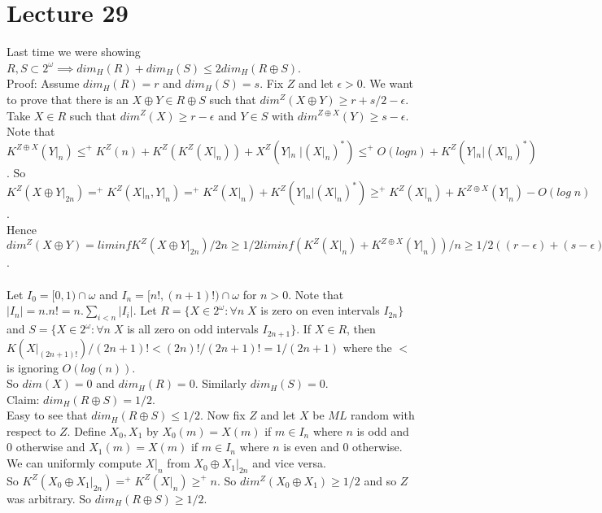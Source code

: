 \documentclass{article}
\begin{document}
  \section{Lecture 29}
  Last time we were showing $R, S \subset 2^\omega \implies dim_H(R) + dim_H(S) \leq 2 dim_H(R\oplus S)$.\\
  Proof: Assume $dim_H(R) = r$ and $dim_H(S) = s$. Fix $Z$ and let $\epsilon > 0$. We want to prove that there is an $X \oplus Y \in R\oplus S$ such that $dim^Z(X \oplus Y) \geq r+s/2 - \epsilon$.\\
  Take $X \in R$ such that $dim^Z(X) \geq r- \epsilon$ and $Y \in S$ with $dim^{Z \oplus X}(Y) \geq s-\epsilon.$\\
  Note that $K^{Z \oplus X}(Y|_n) \leq^+ K^Z(n) + K^Z(K^Z(X|_n)) + X^Z(Y|_n \; | (X|_n)^*) \leq^+ O(log n) + K^Z(Y|_n | (X|_n)^*)$. So $K^Z(X \oplus Y |_{2n}) =^+ K^Z(X|_n,Y|_n) =^+ K^Z(X|_n) + K^Z(Y|_n| (X|_n)^*) \geq^+ K^Z(X|_n) + K^{Z \oplus X} (Y|_n) - O(log\; n)$.
  \\ Hence $dim^Z(X \oplus Y) = lim inf K^Z( X \oplus Y |_{2n})/2n \geq 1/2 lim inf (K^Z(X|_n) + K^{Z \oplus X}(Y|_n))/n \geq 1/2((r- \epsilon ) + (s-\epsilon)) = 1/2(r+s) - \epsilon$.\\
  \\
  Let $I_0 = [0,1)\cap \omega$ and $I_n = [n!, (n+1)!) \cap \omega$ for $n > 0$.
  Note that $|I_n| = n.n! = n.\sum_{i<n} |I_i|$. Let $R = \{ X \in 2^\omega: \forall n \; X$ is zero on even intervals $I_{2n}\}$ and $S= \{X \in 2^\omega : \forall n \; X$ is all zero on odd intervals $I_{2n+1}\}$. If $X \in R$, then $K(X|_{(2n+1)!})/(2n+1)! < (2n)!/(2n+1)! = 1/(2n+1)$ where the $<$ is ignoring $O(log (n))$. \\
  So $dim(X ) = 0$ and $dim_H(R) = 0$. Similarly $dim_H(S) = 0$. \\
  Claim: $dim_H(R \oplus S) = 1/2$.\\
  Easy to see that $dim_H(R \oplus S) \leq 1/2$. Now fix $Z$ and let $X$ be $ML$ random with respect to $Z$. Define $X_0,X_1$ by $X_0(m) = X(m)$ if $m \in I_n$ where $n$ is odd and $0$ otherwise and $X_1(m) = X(m)$ if $m \in I_n$ where $n$ is even and $0$ otherwise. \\
  We can uniformly compute $X|_n$ from $X_0 \oplus X_1 |_{2n}$ and vice versa.\\
  So $K^Z(X_0 \oplus X_1 |_{2n}) =^+ K^Z(X|_n) \geq^+ n$. So $dim^Z(X_0 \oplus X_1) \geq 1/2$ and so $Z$ was arbitrary. So $dim_H(R\oplus S) \geq 1/2$.
\end{document}
